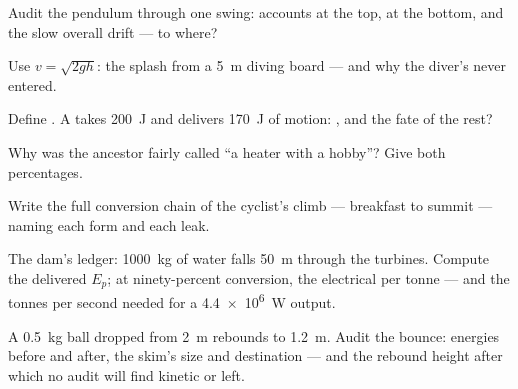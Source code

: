 \begin{exercise}[$\star$]\label{exo:g9:energy-conversions:4}
Audit the pendulum through one swing: accounts at the top,
at the bottom, and the slow overall drift --- to where?
\end{exercise}

\begin{exercise}[$\star$]\label{exo:g9:energy-conversions:5}
Use $v = \sqrt{2 g h}$: the splash  from a \qty{5}{m}
diving board --- and why the diver's  never entered.
\end{exercise}

\begin{exercise}[$\star$]\label{exo:g9:energy-conversions:6}
Define . A  takes \qty{200}{J} and delivers
\qty{170}{J} of motion: , and the fate of the
rest?
\end{exercise}

\begin{exercise}[$\star$]\label{exo:g9:energy-conversions:7}
Why was the ancestor  fairly called ``a heater with a
hobby''? Give both percentages.
\end{exercise}

\begin{exercise}[$\star$]\label{exo:g9:energy-conversions:8}
Write the full conversion chain of the cyclist's climb ---
breakfast to summit --- naming each form and each leak.
\end{exercise}

\begin{exercise}[$\star\star$]\label{exo:g9:energy-conversions:9}
The dam's ledger: \qty{1000}{kg} of water falls \qty{50}{m}
through the turbines. Compute the delivered $E_p$; at
ninety-percent conversion, the electrical  per tonne
--- and the tonnes per second needed for a
\qty{4.4e6}{W} output.
\end{exercise}

\begin{exercise}[$\star\star$]\label{exo:g9:energy-conversions:10}
A \qty{0.5}{kg} ball dropped from \qty{2}{m} rebounds to
\qty{1.2}{m}. Audit the bounce: energies before and after,
the skim's size and destination --- and the rebound height
after which no audit will find kinetic or 
left.
\end{exercise}

